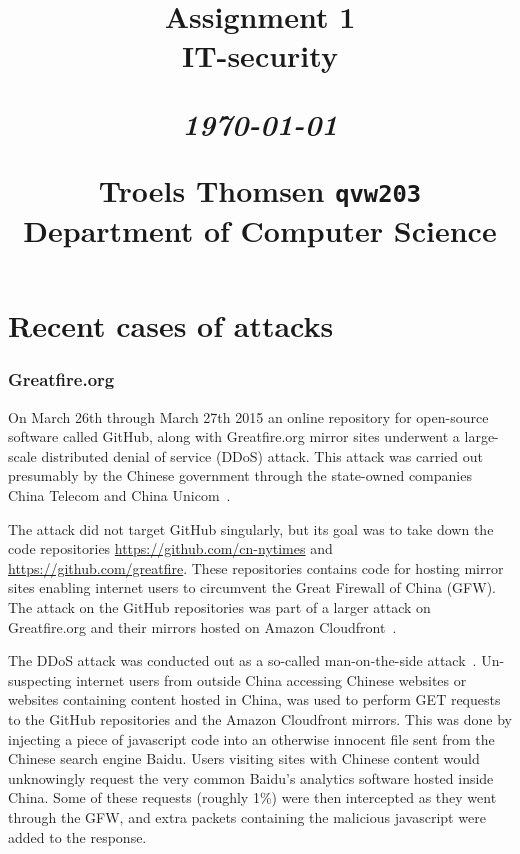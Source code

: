 \documentclass[12pt]{article}
\title{
  \vspace{4cm}
  \begin{flushleft}
  \Large{\textbf{Assignment 1}} \\
  \large{IT-security}
  \end{flushleft}
  \vspace{0cm}
  \begin{flushleft}
  \small
  \textit{\today}
  \end{flushleft}
  \vspace{12cm}
  \begin{flushleft}
  \small
  Troels Thomsen \texttt{qvw203} \\
  Department of Computer Science
  \end{flushleft}
}
\date{
}
\def \ColourPDF {include/ku-farve}
\def \TitlePDF {include/nat-en}  %
\begin{document}

\clearpage
{}
\thispagestyle{empty}
\maketitle

\newpage

\tableofcontents
\newpage


\section{Recent cases of attacks}

\subsubsection{Greatfire.org}
On March 26th through March 27th 2015 an online repository for open-source software called GitHub, along with Greatfire.org mirror sites underwent a large-scale distributed denial of service (DDoS) attack. This attack was carried out presumably by the Chinese government through the state-owned companies China Telecom and China Unicom~\cite{erik-hjelmvik}.

The attack did not target GitHub singularly, but its goal was to take down the code repositories \url{https://github.com/cn-nytimes} and \url{https://github.com/greatfire}. These repositories contains code for hosting mirror sites enabling internet users to circumvent the Great Firewall of China (GFW). The attack on the GitHub repositories was part of a larger attack on Greatfire.org and their mirrors hosted on Amazon Cloudfront~\cite{greatfire}.

The DDoS attack was conducted out as a so-called man-on-the-side attack~\cite{great-cannon}. Un-suspecting internet users from outside China accessing Chinese websites or websites containing content hosted in China, was used to perform GET requests to the GitHub repositories and the Amazon Cloudfront mirrors. This was done by injecting a piece of javascript code into an otherwise innocent file sent from the Chinese search engine Baidu. Users visiting sites with Chinese content would unknowingly request the very common Baidu's analytics software hosted inside China. Some of these requests (roughly 1\%) were then intercepted as they went through the GFW, and extra packets containing the malicious javascript were added to the response.
\end{document}
